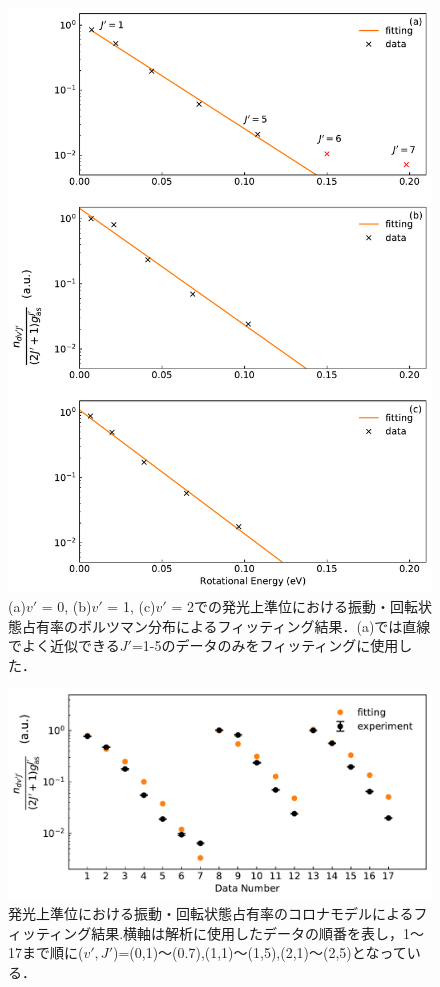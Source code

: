 \begin{figure}
    \centering
    \includegraphics[width=15cm]{pictures/upper-fitting.pdf}
    \caption[発光上準位における振動・回転状態占有率のボルツマン分布によるフィッティング結果]{(a)$v'$ = 0, (b)$v'$ = 1, (c)$v'$ = 2での発光上準位における振動・回転状態占有率のボルツマン分布によるフィッティング結果．(a)では直線でよく近似できる$J'$=1-5のデータのみをフィッティングに使用した．}
    \label{fig:upper-fitting}
\end{figure}

\begin{figure}
    \centering
    \includegraphics[width=15cm]{pictures/fitting-result.pdf}
    \caption[発光上準位における振動・回転状態占有率のコロナモデルによるフィッティング結果]{発光上準位における振動・回転状態占有率のコロナモデルによるフィッティング結果.横軸は解析に使用したデータの順番を表し，1〜17まで順に($v',J'$)=(0,1)〜(0.7),(1,1)〜(1,5),(2,1)〜(2,5)となっている．}
    \label{fig:fitting-result}
\end{figure}

